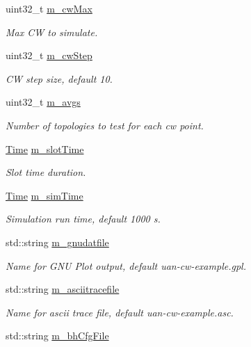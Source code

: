 \begin{DoxyCompactItemize}
uint32\+\_\+t \hyperlink{classExperiment_a3be9291afcc8b97db510b56314701946}{m\+\_\+cw\+Max}
\begin{DoxyCompactList}\small\item\em Max CW to simulate. \end{DoxyCompactList}\item 
uint32\+\_\+t \hyperlink{classExperiment_aef4f5d42255d8ebf188b6d760eb7992b}{m\+\_\+cw\+Step}
\begin{DoxyCompactList}\small\item\em CW step size, default 10. \end{DoxyCompactList}\item 
uint32\+\_\+t \hyperlink{classExperiment_a51ad00a867fb74254c5ec3d4e0e34272}{m\+\_\+avgs}
\begin{DoxyCompactList}\small\item\em Number of topologies to test for each cw point. \end{DoxyCompactList}\item 
\hyperlink{classns3_1_1Time}{Time} \hyperlink{classExperiment_a72df8f8bffaba83db6821d0cf5b593fb}{m\+\_\+slot\+Time}
\begin{DoxyCompactList}\small\item\em Slot time duration. \end{DoxyCompactList}\item 
\hyperlink{classns3_1_1Time}{Time} \hyperlink{classExperiment_a3440bfac76174e478b35aa810d17543c}{m\+\_\+sim\+Time}
\begin{DoxyCompactList}\small\item\em Simulation run time, default 1000 s. \end{DoxyCompactList}\item 
std\+::string \hyperlink{classExperiment_aaa700bd4f3a5f4cf40c866b38ea106e4}{m\+\_\+gnudatfile}
\begin{DoxyCompactList}\small\item\em Name for G\+NU Plot output, default uan-\/cw-\/example.\+gpl. \end{DoxyCompactList}\item 
std\+::string \hyperlink{classExperiment_a2040a4b09ef5134b96b356543efd59df}{m\+\_\+asciitracefile}
\begin{DoxyCompactList}\small\item\em Name for ascii trace file, default uan-\/cw-\/example.\+asc. \end{DoxyCompactList}\item 
std\+::string \hyperlink{classExperiment_a91038b741239a7597fbabc94b7b02fa4}{m\+\_\+bh\+Cfg\+File}

\end{DoxyCompactItemize}
